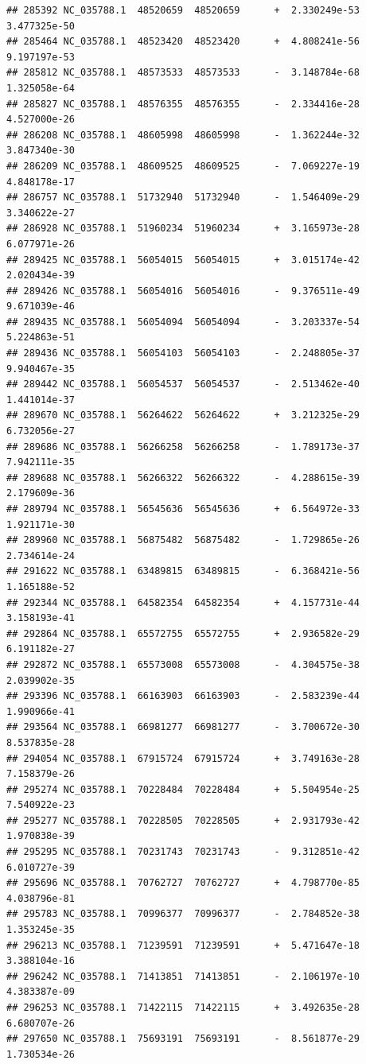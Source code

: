 \documentclass[]{article}
\begin{document}
\begin{verbatim}
## 285392 NC_035788.1  48520659  48520659      +  2.330249e-53  3.477325e-50
## 285464 NC_035788.1  48523420  48523420      +  4.808241e-56  9.197197e-53
## 285812 NC_035788.1  48573533  48573533      -  3.148784e-68  1.325058e-64
## 285827 NC_035788.1  48576355  48576355      -  2.334416e-28  4.527000e-26
## 286208 NC_035788.1  48605998  48605998      -  1.362244e-32  3.847340e-30
## 286209 NC_035788.1  48609525  48609525      -  7.069227e-19  4.848178e-17
## 286757 NC_035788.1  51732940  51732940      -  1.546409e-29  3.340622e-27
## 286928 NC_035788.1  51960234  51960234      +  3.165973e-28  6.077971e-26
## 289425 NC_035788.1  56054015  56054015      +  3.015174e-42  2.020434e-39
## 289426 NC_035788.1  56054016  56054016      -  9.376511e-49  9.671039e-46
## 289435 NC_035788.1  56054094  56054094      -  3.203337e-54  5.224863e-51
## 289436 NC_035788.1  56054103  56054103      -  2.248805e-37  9.940467e-35
## 289442 NC_035788.1  56054537  56054537      -  2.513462e-40  1.441014e-37
## 289670 NC_035788.1  56264622  56264622      +  3.212325e-29  6.732056e-27
## 289686 NC_035788.1  56266258  56266258      -  1.789173e-37  7.942111e-35
## 289688 NC_035788.1  56266322  56266322      -  4.288615e-39  2.179609e-36
## 289794 NC_035788.1  56545636  56545636      +  6.564972e-33  1.921171e-30
## 289960 NC_035788.1  56875482  56875482      -  1.729865e-26  2.734614e-24
## 291622 NC_035788.1  63489815  63489815      -  6.368421e-56  1.165188e-52
## 292344 NC_035788.1  64582354  64582354      +  4.157731e-44  3.158193e-41
## 292864 NC_035788.1  65572755  65572755      +  2.936582e-29  6.191182e-27
## 292872 NC_035788.1  65573008  65573008      -  4.304575e-38  2.039902e-35
## 293396 NC_035788.1  66163903  66163903      -  2.583239e-44  1.990966e-41
## 293564 NC_035788.1  66981277  66981277      -  3.700672e-30  8.537835e-28
## 294054 NC_035788.1  67915724  67915724      +  3.749163e-28  7.158379e-26
## 295274 NC_035788.1  70228484  70228484      +  5.504954e-25  7.540922e-23
## 295277 NC_035788.1  70228505  70228505      +  2.931793e-42  1.970838e-39
## 295295 NC_035788.1  70231743  70231743      -  9.312851e-42  6.010727e-39
## 295696 NC_035788.1  70762727  70762727      +  4.798770e-85  4.038796e-81
## 295783 NC_035788.1  70996377  70996377      -  2.784852e-38  1.353245e-35
## 296213 NC_035788.1  71239591  71239591      +  5.471647e-18  3.388104e-16
## 296242 NC_035788.1  71413851  71413851      -  2.106197e-10  4.383387e-09
## 296253 NC_035788.1  71422115  71422115      +  3.492635e-28  6.680707e-26
## 297650 NC_035788.1  75693191  75693191      -  8.561877e-29  1.730534e-26

\end{verbatim}
\end{document}
